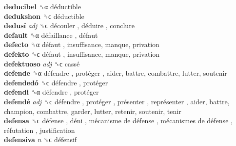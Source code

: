 \textbf{deducibel} ␝α   déductible   \\
\textbf{dedukshon} ␝ϲ   déductible   \\
\textbf{dedusí} \emph{adj}  ␝ϲ   découler ,  déduire , conclure  \\
\textbf{default} ␝α   défaillance ,  défaut   \\
\textbf{defecto} ␝α   défaut , insuffisance, manque, privation  \\
\textbf{defekto} ␝ϲ   défaut , insuffisance, manque, privation  \\
\textbf{defektuoso} \emph{adj}  ␝ϲ   cassé   \\
\textbf{defende} ␝α   défendre ,  protéger , aider, battre, combattre, lutter, soutenir  \\
\textbf{defendedó} ␝ϲ   défendre ,  protéger   \\
\textbf{defendi} ␝α   défendre ,  protéger   \\
\textbf{defendé} \emph{adj}  ␝ϲ   défendre ,  protéger ,  présenter ,  représenter , aider, battre, champion, combattre, garder, lutter, retenir, soutenir, tenir  \\
\textbf{defensa} ␝ϲ   défense ,  déni ,  mécanisme de défense ,  mécanismes de défense ,  réfutation , justification  \\
\textbf{defensiva} \emph{n}  ␝ϲ   défensif   \\
